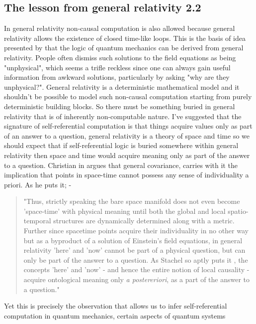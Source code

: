 \documentclass[
   ,final            %
  ]
  {aipproc}
\begin{document}
\subsection{The lesson from general relativity 2.2}
\par
In general relativity non-causal computation is also allowed because general relativity allows the existence
of closed time-like loops. This is the basis of idea presented by \citet{Hadley} that the logic of quantum mechanics
can be derived from general relativity. People often dismiss such solutions to the field equations as being "unphysical", which seems a trifle %
reckless since one can always gain useful information from awkward solutions, particularly by asking "why are they unphysical?". General relativity is %
a deterministic mathematical model and it shouldn't be possible to model such non-causal computation starting from purely deterministic building %
blocks. So there must be something buried in general
relativity that is of inherently non-computable nature. I've suggested that the signature of self-referential computation
is that things acquire values only as part of an answer to a question, general relativity is a theory of space
and time so we should expect that if self-referential logic is buried somewhere within general relativity
then space and time would acquire meaning only as part of the answer to a question. Christian in \citep[chap.~14]{phys_meets_philosophy}
argues that general covariance, carries with it the implication that points in space-time cannot possess any
sense of individuality a priori. As he puts it; -
\begin{quotation}
"Thus, strictly speaking the bare space manifold does not even become 'space-time' with physical
meaning until both the global and local spatio-temporal structures are dynamically determined
along with a metric. Further since spacetime points acquire their individuality in no other way
but as a byproduct of a solution of Einstein's field equations, in general relativity 'here' and 'now'
cannot be part of a physical question, but can only be part of the answer to a question. As Stachel
so aptly puts it \cite{Stachel}, the concepts 'here' and 'now' - and hence the entire notion of local causality -
acquire ontological meaning only \emph{a postereriori}, as a part of the answer to a question."
\end{quotation}
\par
Yet this is precisely the observation that allows us to infer self-referential computation in quantum mechanics, certain aspects of quantum systems %
\end{document}
